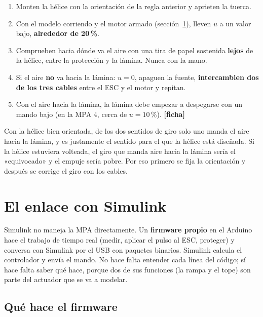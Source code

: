 \documentclass[11pt,letterpaper]{article}
\newcommand{\ficha}{\textcolor{verdeOK}{\textbf{[ficha]}}}  %
\begin{document}
\begin{pasos}
\begin{enumerate}[leftmargin=14pt]
  \item Monten la hélice con la orientación de la regla anterior y aprieten la tuerca.
  \item Con el modelo corriendo y el motor armado (sección~\ref{sec:enlace}), lleven $u$ a un valor bajo, \textbf{alrededor de 20\,\%}.
  \item Comprueben hacia dónde va el aire con una tira de papel sostenida \textbf{lejos} de la hélice, entre la protección y la lámina. Nunca con la mano.
  \item Si el aire \textbf{no} va hacia la lámina: $u=0$, apaguen la fuente, \textbf{intercambien dos de los tres cables} entre el ESC y el motor y repitan.
  \item Con el aire hacia la lámina, la lámina debe empezar a despegarse con un mando bajo (en la MPA 4, cerca de $u=10\,\%$). \ficha
\end{enumerate}
\end{pasos}

\begin{nota}
Con la hélice bien orientada, de los dos sentidos de giro solo uno manda el aire hacia la lámina, y es justamente el sentido para el que la hélice está diseñada. Si la hélice estuviera volteada, el giro que manda aire hacia la lámina sería el «equivocado» y el empuje sería pobre. Por eso primero se fija la orientación y después se corrige el giro con los cables.
\end{nota}

\section{El enlace con Simulink}\label{sec:enlace}

Simulink no maneja la MPA directamente. Un \textbf{firmware propio} en el Arduino hace el trabajo de tiempo real (medir, aplicar el pulso al ESC, proteger) y conversa con Simulink por el USB con paquetes binarios. Simulink calcula el controlador y envía el mando. No hace falta entender cada línea del código; sí hace falta saber qué hace, porque dos de sus funciones (la rampa y el tope) son parte del actuador que se va a modelar.

\subsection{Qué hace el firmware}
\end{document}
